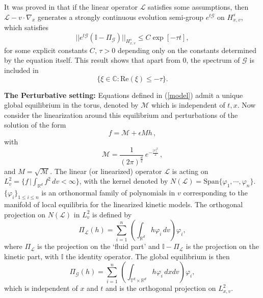 \documentclass[final,onefignum,onetabnum]{siamart171218}
\begin{document}
It was proved in \cite{CN} that if the linear operator $\mathcal L$ satisfies some assumptions, then 
$\mathcal L -v\cdot\nabla_x$ generates a strongly continuous evolution semi-group $e^{t\mathcal{G}}$ on $H_{x,v}^s$, which satisfies
\begin{equation}||e^{t\mathcal{G}}(\mathbb I-\Pi_{\mathcal G})||_{H^s_{x,v}} \leq C \exp[-\tau t], \label{CN_thm1} \end{equation}
for some explicit constants $C, \, \tau>0$ depending only on the constants determined by the equation itself.
This result shows that apart from $0$, the spectrum of $\mathcal G$ is included in
$$\{\xi \in\mathbb C: \text{Re}(\xi)\leq -\tau\}. $$

{\bf The Perturbative setting: }
Equations defined in (\ref{model}) admit a unique global equilibrium in the torus, denoted by $\mathcal M$ which is independent of $t,x$.
Now consider the linearization around this equilibrium and perturbations of the solution of the form
\begin{equation}
  f=\mathcal M+ \epsilon M h\,, 
  \label{per-f}
  \end{equation}
with $$\mathcal M=\frac{1}{(2\pi)^{\frac{d}{2}}}\, e^{-\frac{|v|^2}{2}}\,,$$
and $M=\sqrt{\mathcal M}$. 
The linear (or linearized) operator $\mathcal L$ is acting on $L^2_v=\{f\, |\int_{\mathbb R^d} f^2\, dv <\infty\}$, 
with the kernel denoted by $N(\mathcal L)=\text{Span}\{\varphi_1, \cdots, \varphi_n\}$.
$\{\varphi_i\}_{1\leq i\leq n}$ is an orthonormal family of polynomials in $v$ corresponding to the manifold of local equilibria for the linearized kinetic models.
The orthogonal projection on $N(\mathcal L)$ in $L^2_v$ is defined by
\begin{equation}\label{Pi}\Pi_{\mathcal L} (h) = \sum_{i=1}^{n}\, \left(\int_{\mathbb R^d} h\varphi_i\, dv\right)\varphi_i, \end{equation}
where $\Pi_{\mathcal L}$ is the projection on the `fluid part' and $\mathbb I-\Pi_{\mathcal L}$ is the projection on the kinetic part,
with $\mathbb I$ the identity operator.
 The global equilibrium is then
\begin{equation}\label{PiG}\Pi_{\mathcal G} (h) =\sum_{i=1}^{n}\, \left(\int_{\mathbb T^d\times{\mathbb R^d}}h\varphi_i\, dx dv\right)\varphi_i,
\end{equation}
which is independent of $x$ and $t$ and is the orthogonal projection on $L^2_{x,v}$. \\[1pt]
\end{document}
